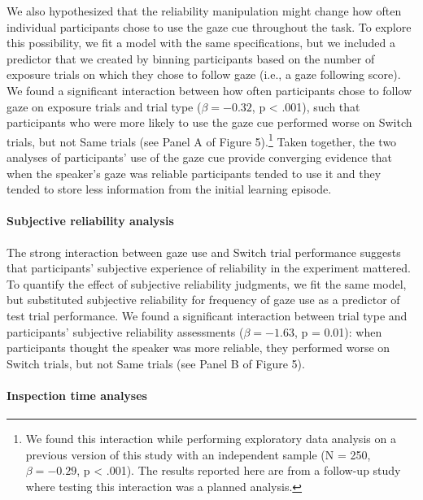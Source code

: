 \documentclass[authoryear, review]{elsarticle}
\begin{document}
We also hypothesized that the reliability manipulation might change how
often individual participants chose to use the gaze cue throughout the
task. To explore this possibility, we fit a model with the same
specifications, but we included a predictor that we created by binning
participants based on the number of exposure trials on which they chose
to follow gaze (i.e., a gaze following score). We found a significant
interaction between how often participants chose to follow gaze on
exposure trials and trial type (\(\beta = -0.32\), p \textless{} .001),
such that participants who were more likely to use the gaze cue
performed worse on Switch trials, but not Same trials (see Panel A of
Figure 5).\footnote{We found this interaction while performing
  exploratory data analysis on a previous version of this study with an
  independent sample (N = 250, \(\beta = -0.29\), p \textless{} .001).
  The results reported here are from a follow-up study where testing
  this interaction was a planned analysis.} Taken together, the two
analyses of participants' use of the gaze cue provide converging
evidence that when the speaker's gaze was reliable participants tended
to use it and they tended to store less information from the initial
learning episode.

\paragraph{Subjective reliability
analysis}\label{subjective-reliability-analysis}

The strong interaction between gaze use and Switch trial performance
suggests that participants' subjective experience of reliability in the
experiment mattered. To quantify the effect of subjective reliability
judgments, we fit the same model, but substituted subjective reliability
for frequency of gaze use as a predictor of test trial performance. We
found a significant interaction between trial type and participants'
subjective reliability assessments (\(\beta = -1.63\), p = 0.01): when
participants thought the speaker was more reliable, they performed worse
on Switch trials, but not Same trials (see Panel B of Figure 5).

\paragraph{Inspection time analyses}\label{inspection-time-analyses}
\end{document}
